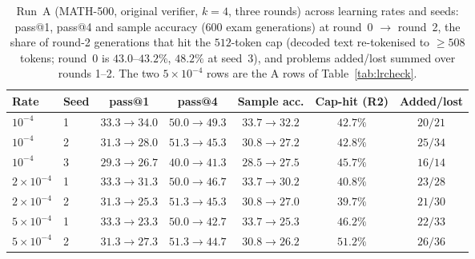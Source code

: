\documentclass[runningheads]{llncs}
\begin{document}
\begin{table}[!htb]
\caption{Run~A (MATH-500, original verifier, $k=4$, three rounds) across learning
rates and seeds: pass@1, pass@4 and sample accuracy (600 exam generations) at
round~0 $\to$ round~2, the share of round-2 generations that hit the
$512$-token cap (decoded text re-tokenised to $\ge508$ tokens; round~0 is
$43.0$--$43.2\%$, $48.2\%$ at seed~3), and problems added/lost summed over
rounds 1--2. The two $5\times10^{-4}$ rows are the A rows
of Table~\ref{tab:lrcheck}.}
\label{tab:lrseries}
\centering
\setlength{\tabcolsep}{3pt}
\begin{tabular}{llccccc}
\toprule
Rate & Seed & pass@1 & pass@4 & Sample acc. & Cap-hit (R2) & Added/lost \\
\midrule
$10^{-4}$ & 1 & $33.3\to34.0$ & $50.0\to49.3$ & $33.7\to32.2$ & $42.7\%$ & $20/21$ \\
$10^{-4}$ & 2 & $31.3\to28.0$ & $51.3\to45.3$ & $30.8\to27.2$ & $42.8\%$ & $25/34$ \\
$10^{-4}$ & 3 & $29.3\to26.7$ & $40.0\to41.3$ & $28.5\to27.5$ & $45.7\%$ & $16/14$ \\
$2\times10^{-4}$ & 1 & $33.3\to31.3$ & $50.0\to46.7$ & $33.7\to30.2$ & $40.8\%$ & $23/28$ \\
$2\times10^{-4}$ & 2 & $31.3\to25.3$ & $51.3\to45.3$ & $30.8\to27.0$ & $39.7\%$ & $21/30$ \\
$5\times10^{-4}$ & 1 & $33.3\to23.3$ & $50.0\to42.7$ & $33.7\to25.3$ & $46.2\%$ & $22/33$ \\
$5\times10^{-4}$ & 2 & $31.3\to27.3$ & $51.3\to44.7$ & $30.8\to26.2$ & $51.2\%$ & $26/36$ \\
\bottomrule
\end{tabular}
\end{table}
\end{document}
